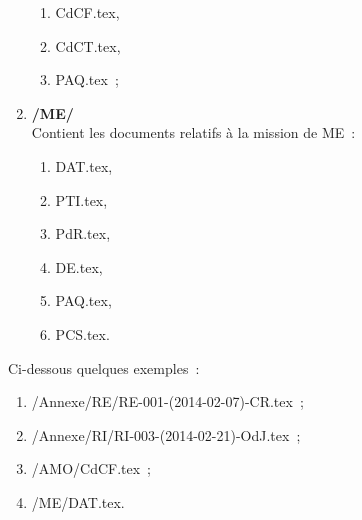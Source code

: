 \documentclass[11pt,fleqn]{report}
\begin{document}
\begin{enumerate}
\begin{enumerate}
		\item CdCF.tex,
		\item CdCT.tex,
		\item PAQ.tex~;
	\end{enumerate}
	\item \textbf{/ME/}
	\\
	Contient les documents relatifs à la mission de ME~:
	\begin{enumerate}
		\item DAT.tex,
		\item PTI.tex,
		\item PdR.tex,
		\item DE.tex,
		\item PAQ.tex,
		\item PCS.tex.
	\end{enumerate}
\end{enumerate}
Ci-dessous quelques exemples~:
\begin{enumerate}
	\item /Annexe/RE/RE-001-(2014-02-07)-CR.tex~;
	\item /Annexe/RI/RI-003-(2014-02-21)-OdJ.tex~;
	\item /AMO/CdCF.tex~;
	\item /ME/DAT.tex.
\end{enumerate}
\end{document}
